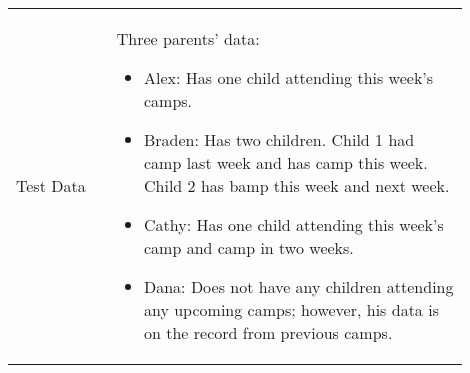 \documentclass[11pt]{article}
\begin{document}
\begin{table}[H]
\begin{center}
\begin{tabular}{p{0.20\linewidth}p{0.70\linewidth}}
	Test Data & \vspace*{.25em} Three parents' data:
	\begin{itemize}[topsep=0pt]
		\item Alex: Has one child attending this week's camps.
		\item Braden: Has two children. Child 1 had camp last week and has camp this week. Child 2 has bamp this week and next week.
		\item Cathy: Has one child attending this week's camp and camp in two weeks.
		\item Dana: Does not have any children attending any upcoming camps; however, his data is on the record from previous camps.
	\end{itemize}
\end{tabular}
\end{center}
\end{table}
\end{document}

